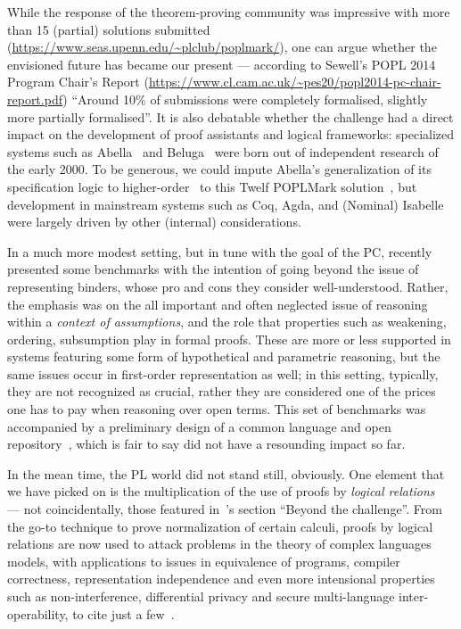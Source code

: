 While the response of the theorem-proving community was impressive
with more than 15 (partial) solutions submitted
(\url{https://www.seas.upenn.edu/~plclub/poplmark/}), one can argue
whether the envisioned future has became our present --- according to
Sewell's POPL 2014 Program Chair's Report
(\url{https://www.cl.cam.ac.uk/~pes20/popl2014-pc-chair-report.pdf})
``Around 10\% of submissions were completely formalised, slightly more
partially formalised''. It is also debatable whether the challenge had
a direct impact on the development of proof assistants and logical
frameworks: specialized systems such as Abella~\citep{BaeldeCGMNTW14}
and Beluga~\citep{PientkaC15} were born out of independent research of
the early 2000. To be generous, we could impute Abella's generalization
of its specification logic to higher-order~\citep{hoabella} to this
Twelf POPLMark solution~\citep{Pientka07}, but development in
mainstream systems such as Coq, Agda, and (Nominal) Isabelle were
largely driven by other (internal) considerations.


In a much more modest setting, but in tune  with the goal of the PC,
\cite{FMP17} recently presented some benchmarks with the intention of going
beyond the issue of representing binders, whose pro and cons they
consider well-understood. Rather, the emphasis was on the all
important and often neglected issue of reasoning within a
\emph{context of assumptions}, and the role that properties such as
weakening, ordering, subsumption play in formal proofs. These
are more or less supported  in systems featuring some form of 
hypothetical and parametric reasoning, but the same issues occur in
first-order representation as well; in this setting, typically, they are not
recognized as crucial, rather they are considered one of the prices one
has to pay when reasoning over open terms. This set of benchmarks was
accompanied by a preliminary design of a common language and open
repository~\citep{FeltyMP15}, which is fair to say did not have a
resounding impact so far.

In the mean time, the PL world did not stand still, obviously.  One
element that we have picked on is the multiplication of the use of
proofs by \emph{logical relations}~\citep{Statman85} --- not
coincidentally, those featured in~\cite{Aydemir05TPHOLs}'s section ``Beyond the
challenge''.  From the go-to technique to prove normalization of
certain calculi, proofs by logical relations are now used to attack
problems in the theory of complex languages models, with 
applications to issues in equivalence of programs, {compiler
  correctness}, representation independence and even more intensional
properties such as non-interference, differential privacy and secure
multi-language inter-operability, to cite just a
few~\citep{Ahmed15,BowmanA15,NeisHKMDV15}.

